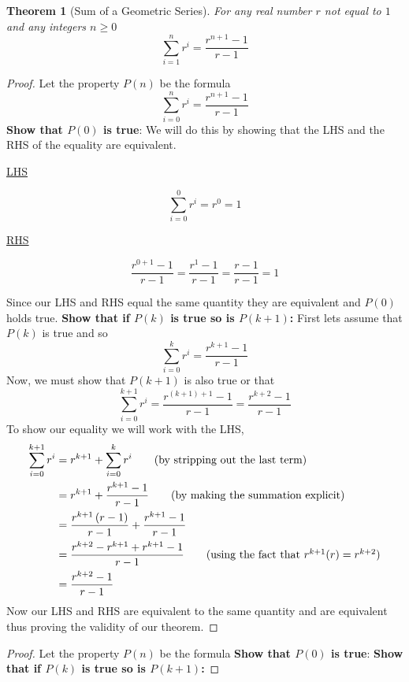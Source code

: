 \documentclass[addpoints]{exam}
\newtheorem{theorem}{Theorem}
\begin{document}
    \begin{theorem}[Sum of a Geometric Series]
      For any real number $r$ not equal to $1$ and any integers $n \geq 0$
      \[
      \sum\limits_{i=1}^{n} r^{i} = \frac{r^{n+1} - 1}{r-1}
      \]
    \end{theorem}
    \ifprintanswers
    \begin{proof}
      Let the property $P(n)$ be the formula 
      \[
        \sum\limits_{i=0}^{n} r^{i} = \frac{r^{n+1}-1}{r-1}
      \]
      \textbf{Show that $P(0)$ is true}: We will do this by showing that the LHS and the RHS of the equality are equivalent.
      \begin{minipage}[t]{0.45\linewidth}
        \begin{center}
          \underline{LHS}
        \end{center}
        \[
          \sum\limits_{i=0}^{0} r^{i} = r^{0} = 1
        \]
      \end{minipage}
      \hfill
      \begin{minipage}[t]{0.45\linewidth}
        \begin{center}
          \underline{RHS}
        \end{center}
        \[
          \frac{r^{0+1}-1}{r-1} = \frac{r^1-1}{r-1} = \frac{r-1}{r-1} = 1
        \]
      \end{minipage}
      \vspace{0.2in}\newline Since our LHS and RHS equal the same quantity they are equivalent and $P(0)$ holds true.
      \newline \textbf{Show that if $P(k)$ is true so is $P(k+1)$:} First lets assume that $P(k)$ is true and so 
      \[
        \sum\limits_{i=0}^{k} r^i = \frac{r^{k+1}-1}{r-1}
      \]
      Now, we must show that $P(k+1)$ is also true or that
      \[
        \sum\limits_{i=0}^{k+1} r^i = \frac{r^{(k+1)+1}-1}{r-1} = \frac{r^{k+2}-1}{r-1}
      \]
      To show our equality we will work with the LHS, 
      \begin{align*}
        \sum\limits_{i=0}^{k+1} r^i &= r^{k+1} + \sum\limits_{i=0}^{k} r^i \tag{by stripping out the last term} \\ 
        &= r^{k+1} + \frac{r^{k+1}-1}{r-1} \tag{by making the summation explicit} \\ 
        &= \frac{r^{k+1}\left(r-1\right)}{r-1} + \frac{r^{k+1}-1}{r-1} \\ 
        &= \frac{r^{k+2} - r^{k+1} + r^{k+1}-1}{r-1} \tag{using the fact that $r^{k+1}(r) = r^{k+2}$} \\ 
        &= \frac{r^{k+2}-1}{r-1}
      \end{align*}
      Now our LHS and RHS are equivalent to the same quantity and are equivalent thus proving the validity of our theorem.
    \end{proof}
    \else
    \begin{proof}
      Let the property $P(n)$ be the formula 
      \vspace{0.5in}
      \newline \textbf{Show that $P(0)$ is true}:
      \vspace{1.5in}
      \newline \textbf{Show that if $P(k)$ is true so is $P(k+1)$:}
      \vspace{2in}
      \newline
    \end{proof}
    \fi
  
\end{document}
